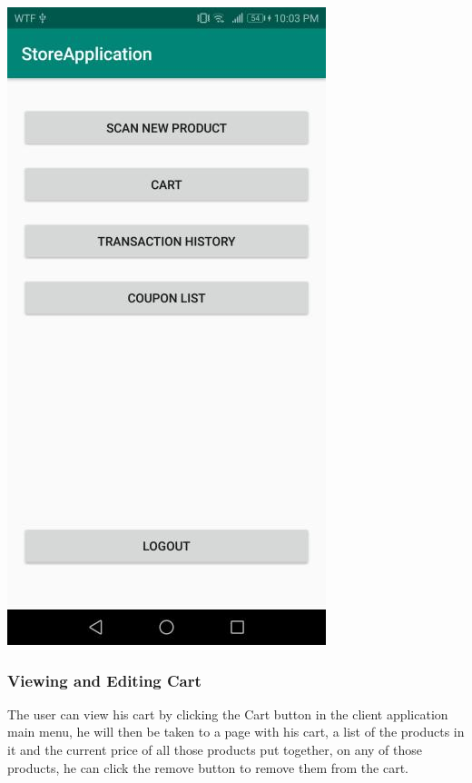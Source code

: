 \documentclass[12pt]{article}
\begin{document}
\begin{center}
\includegraphics[width=0.35\linewidth]{Images/Client/ClientMainMenu.jpg}
\end{center}

\subsubsection{Viewing and Editing Cart}
\hspace{0.6cm}
The user can view his cart by clicking the Cart button in the client application main menu, he will then be taken to a page with
his cart, a list of the products in it and the current price of all those products put together, on any of those products, he can click
the remove button to remove them from the cart.
\end{document}
